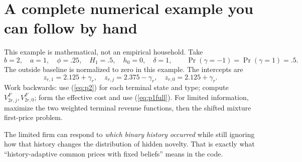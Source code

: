 \documentclass[11pt]{article}
\begin{document}
\section{A complete numerical example you can follow by hand}
This example is mathematical, not an empirical household. Take
\[
 b=2,\quad a=1,\quad\phi=.25,\quad H_1=.5,\quad h_0=0,\quad\delta=1,
 \qquad\Pr(\gamma=-1)=\Pr(\gamma=1)=.5.
\]
The outside baseline is normalized to zero in this example. The intercepts are
\[
 z_{r,1}=2.125+\gamma_r,\quad
 z_{r,j}=2.375-\gamma_r,\quad z_{r,0}=2.125+\gamma_r.
\]
Work backwards: use (\ref{eq:p2}) for each terminal state and type; compute $V^F_{2r,j},V^F_{2r,0}$; form the effective cost and use (\ref{eq:p1full}). For limited information, maximize the two weighted terminal revenue functions, then the shifted mixture first-price problem.
\begin{center}\end{center}




The limited firm can respond to \emph{which binary history occurred} while still ignoring how that history changes the distribution of hidden novelty. That is exactly what ``history-adaptive common prices with fixed beliefs'' means in the code.
\end{document}
